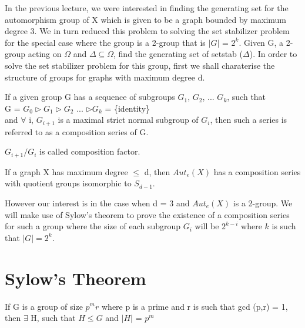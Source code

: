 
In the previous lecture, we were interested in finding the generating set for
the automorphism group of X which is given to be a graph bounded by maximum
degree 3. We in turn reduced this problem to solving the set stabilizer
problem for the special case where the group is a 2-group that is $|G|$ =
$2^{k}$.  Given G, a 2-group acting on $\Omega$ and $\Delta \subseteq \Omega$,
find the generating set of setstab ($\Delta$). In order to solve the set
stabilizer problem for this group, first we shall charaterise the structure of
groups for graphs with maximum degree d.

\begin{definition}

If a given group G has a sequence of subgroups $G_{1}$, $G_{2}$, ... $G_{k}$, such that \\
G = $G_{0} \triangleright G_{1} \triangleright G_{2}$ ... $\triangleright G_{k}$ = \{identity\} \\
and $\forall$ i, $G_{i+1}$ is a maximal strict normal subgroup of $G_{i}$, then such a series is referred to as a composition series of G.

$G_{i+1} / G_{i}$ is called composition factor.
\end{definition}

\begin{claim}
If a graph X has maximum degree $\leq$ d, then $Aut_{e}(X)$ has a composition series with quotient groups isomorphic to $S_{d-1}$.
\end{claim}

However our interest is in the case when d = 3 and $Aut_{e}(X)$ is a 2-group. We will make use of Sylow's theorem to prove the existence of a composition series for such a group where the size of each subgroup $G_{i}$ will be $2^{k - i}$ where $k$ is such that $|G| = 2^{k}$. 

\section{Sylow's Theorem}

\begin{theorem}
If G is a group of size $p^{m}r$ where p is a prime and r is such that gcd (p,r) = 1, then $\exists$ H, such that $H \leqslant G$ and $|H|$ = $p^{m}$
\end{theorem}

